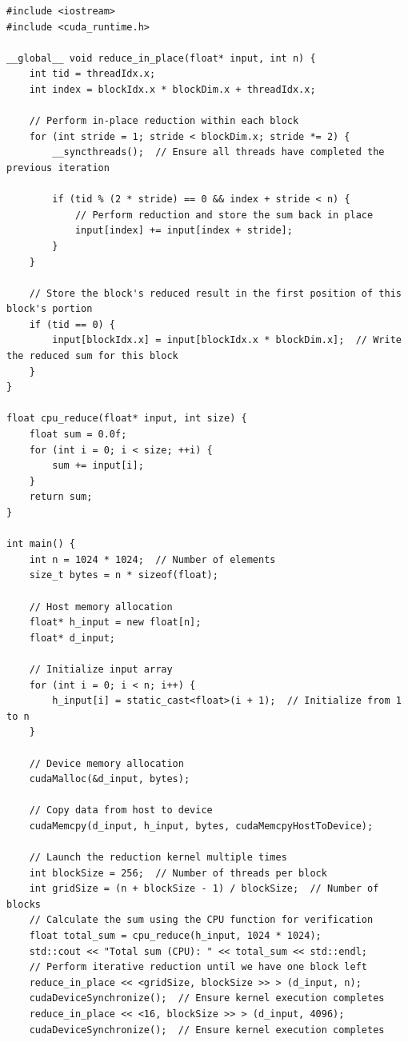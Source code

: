 \begin{lstlisting}
#include <iostream>
#include <cuda_runtime.h>

__global__ void reduce_in_place(float* input, int n) {
    int tid = threadIdx.x;
    int index = blockIdx.x * blockDim.x + threadIdx.x;

    // Perform in-place reduction within each block
    for (int stride = 1; stride < blockDim.x; stride *= 2) {
        __syncthreads();  // Ensure all threads have completed the previous iteration

        if (tid % (2 * stride) == 0 && index + stride < n) {
            // Perform reduction and store the sum back in place
            input[index] += input[index + stride];
        }
    }

    // Store the block's reduced result in the first position of this block's portion
    if (tid == 0) {
        input[blockIdx.x] = input[blockIdx.x * blockDim.x];  // Write the reduced sum for this block
    }
}

float cpu_reduce(float* input, int size) {
    float sum = 0.0f;
    for (int i = 0; i < size; ++i) {
        sum += input[i];
    }
    return sum;
}

int main() {
    int n = 1024 * 1024;  // Number of elements
    size_t bytes = n * sizeof(float);

    // Host memory allocation
    float* h_input = new float[n];
    float* d_input;

    // Initialize input array
    for (int i = 0; i < n; i++) {
        h_input[i] = static_cast<float>(i + 1);  // Initialize from 1 to n
    }

    // Device memory allocation
    cudaMalloc(&d_input, bytes);

    // Copy data from host to device
    cudaMemcpy(d_input, h_input, bytes, cudaMemcpyHostToDevice);

    // Launch the reduction kernel multiple times
    int blockSize = 256;  // Number of threads per block
    int gridSize = (n + blockSize - 1) / blockSize;  // Number of blocks
    // Calculate the sum using the CPU function for verification
    float total_sum = cpu_reduce(h_input, 1024 * 1024);
    std::cout << "Total sum (CPU): " << total_sum << std::endl;
    // Perform iterative reduction until we have one block left
    reduce_in_place << <gridSize, blockSize >> > (d_input, n);
    cudaDeviceSynchronize();  // Ensure kernel execution completes
    reduce_in_place << <16, blockSize >> > (d_input, 4096);
    cudaDeviceSynchronize();  // Ensure kernel execution completes



\end{lstlisting}
